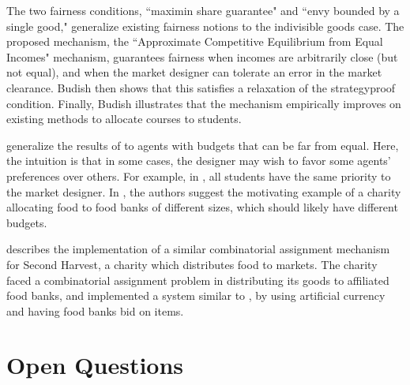 \documentclass[JEL]{AEA}
\begin{document}
The two fairness conditions, ``maximin share guarantee" and ``envy bounded by a single good," generalize existing fairness notions to the indivisible goods case. The proposed mechanism, the ``Approximate Competitive Equilibrium from Equal Incomes" mechanism, guarantees fairness when incomes are arbitrarily close (but not equal), and when the market designer can tolerate an error in the market clearance. Budish then shows that this satisfies a relaxation of the strategyproof condition. Finally, Budish illustrates that the mechanism empirically improves on existing methods to allocate courses to students.

\cite{babaioff-2019} generalize the results of \cite{budish-2011} to agents with budgets that can be far from equal. Here, the intuition is that in some cases, the designer may wish to favor some agents' preferences over others. For example, in \cite{budish-2011}, all students have the same priority to the market designer. In \cite{babaioff-2019}, the authors suggest the motivating example of a charity allocating food to food banks of different sizes, which should likely have different budgets.

\cite{prendergast-2017} describes the implementation of a similar combinatorial assignment mechanism for Second Harvest, a charity which distributes food to markets. The charity faced a combinatorial assignment problem in distributing its goods to affiliated food banks, and implemented a system similar to \cite{budish-2011}, by using artificial currency and having food banks bid on items.

\section{Open Questions}
\end{document}
